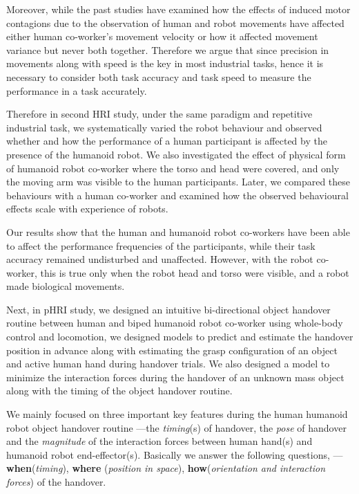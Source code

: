 Moreover, while the past studies have examined how the effects of induced motor contagions due to the observation of human and robot movements have affected either human co-worker's movement velocity or how it affected movement variance but never both together. Therefore we argue that since precision in movements along with speed is the key in most industrial tasks, hence it is necessary to consider both task accuracy and task speed to measure the performance in a task accurately.

Therefore in second HRI study, under the same paradigm and repetitive industrial task, we systematically varied the robot behaviour and observed whether and how the performance of a human participant is affected by the presence of the humanoid robot. We also investigated the effect of physical form of humanoid robot co-worker where the torso and head were covered, and only the moving arm was visible to the human participants. Later, we compared these behaviours with a human co-worker and examined how the observed behavioural effects scale with experience of robots. 

Our results show that the human and humanoid robot co-workers have been able to affect the performance frequencies of the participants, while their task accuracy remained undisturbed and unaffected. However, with the robot co-worker, this is true only when the robot head and torso were visible, and a robot made biological movements.


Next, in pHRI study, we designed an intuitive bi-directional object handover routine between human and biped humanoid robot co-worker using whole-body control and locomotion, we designed models to predict and estimate the handover position in advance along with estimating the grasp configuration of an object and active human hand during handover trials. We also designed a model to minimize the interaction forces during the handover of an unknown mass object along with the timing of the object handover routine.

We mainly focused on three important key features during the human humanoid robot object handover routine ---the \textit{timing}(s) of handover, the \textit{pose} of handover and the \textit{magnitude} of the interaction forces between human hand(s) and humanoid robot end-effector(s). Basically we answer the following questions, ---\textbf{when}(\textit{timing}), \textbf{where} (\textit{position in space}), \textbf{how}(\textit{orientation and interaction forces}) of the handover.

